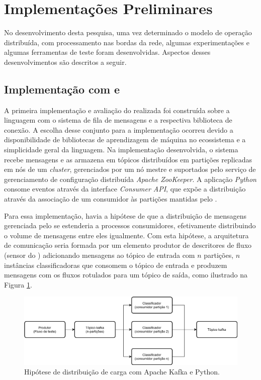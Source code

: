 
\section{Implementações Preliminares}\label{sec:resultados}

No desenvolvimento desta pesquisa, uma vez determinado o modelo de operação
distribuída, com processamento nas bordas da rede, algumas experimentações e
algumas ferramentas de teste foram desenvolvidas. Aspectos desses
desenvolvimentos são descritos a seguir.

\subsection{Implementação com \python e \kafka}

A primeira implementação e avaliação do \mfog realizada foi construída sobre a
linguagem \python com o sistema de fila de mensagens \kafka e a respectiva
biblioteca de conexão.
A escolha desse conjunto para a implementação ocorreu devido a disponibilidade
de bibliotecas de aprendizagem de máquina no ecossistema \python e a
simplicidade geral da linguagem.
Na implementação desenvolvida, o sistema \kafka recebe mensagens e as armazena
em tópicos distribuídos em partições replicadas em nós de um \emph{cluster},
gerenciados por um nó mestre e suportados pelo serviço de gerenciamento de
configuração distribuída \emph{Apache ZooKeeper}.
A aplicação \emph{Python} consome eventos através da interface \emph{Consumer API},
que expõe a distribuição através da associação de um consumidor às partições
mantidas pelo \kafka.

Para essa implementação, havia a hipótese de que a distribuição de
mensagens gerenciada pelo \kafka
se estenderia a processos consumidores, efetivamente distribuindo o volume de
mensagens entre eles igualmente.
Com esta hipótese, a arquitetura de comunicação seria formada por um elemento
produtor de descritores de fluxo (sensor do \nids) adicionando mensagens
ao tópico \kafka de entrada com $n$ partições, $n$ instâncias classificadoras
que consomem o tópico de entrada e produzem mensagens com os fluxos rotulados
para um tópico de saída, como ilustrado na Figura \ref{fig:python-kafka}.

\begin{figure}[htb]
    \centerline{
      \includegraphics[width=\linewidth,page=1]{figures/python-kafka.png}
    }
    \caption{Hipótese de distribuição de carga com Apache Kafka e Python.}
    \label{fig:python-kafka}
\end{figure}

